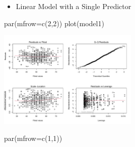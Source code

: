 \documentclass[
  ignorenonframetext,
]{beamer}
\newenvironment{Shaded}{\begin{snugshade}}{\end{snugshade}}
\newcommand{\AttributeTok}[1]{\textcolor[rgb]{0.40,0.45,0.13}{#1}}
\newcommand{\DecValTok}[1]{\textcolor[rgb]{0.68,0.00,0.00}{#1}}
\newcommand{\FunctionTok}[1]{\textcolor[rgb]{0.28,0.35,0.67}{#1}}
\newcommand{\NormalTok}[1]{\textcolor[rgb]{0.00,0.23,0.31}{#1}}
\providecommand{\tightlist}{%
  \setlength{\itemsep}{0pt}\setlength{\parskip}{0pt}}\usepackage{longtable,booktabs,array}
\begin{document}
\begin{frame}[fragile]{}
\label{section-16}
\begin{itemize}
\tightlist
\item
  Linear Model with a Single Predictor
\end{itemize}

\tiny

\begin{Shaded}
\begin{Highlighting}[]
\FunctionTok{par}\NormalTok{(}\AttributeTok{mfrow=}\FunctionTok{c}\NormalTok{(}\DecValTok{2}\NormalTok{,}\DecValTok{2}\NormalTok{))}
\FunctionTok{plot}\NormalTok{(model1)}
\end{Highlighting}
\end{Shaded}

\begin{center}
\includegraphics[width=0.5\textwidth,height=\textheight]{007_identifying_drivers_of_outcomes_linear_models_files/figure-beamer/unnamed-chunk-15-1.pdf}
\end{center}

\begin{Shaded}
\begin{Highlighting}[]
\FunctionTok{par}\NormalTok{(}\AttributeTok{mfrow=}\FunctionTok{c}\NormalTok{(}\DecValTok{1}\NormalTok{,}\DecValTok{1}\NormalTok{))}
\end{Highlighting}
\end{Shaded}
\end{frame}
\end{document}
